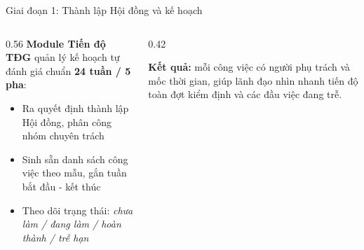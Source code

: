 \documentclass[aspectratio=169, 11pt]{beamer}
\begin{document}
\begin{frame}{Giai đoạn 1: Thành lập Hội đồng và kế hoạch}
\vspace{0.15cm}
\begin{columns}[T]
\begin{column}{0.56\textwidth}\footnotesize
\textbf{\color{daumaroon}Module Tiến độ TĐG} quản lý kế hoạch tự đánh giá chuẩn \textbf{24 tuần / 5 pha}:
\begin{itemize}
  \item Ra quyết định thành lập Hội đồng, phân công nhóm chuyên trách
  \item Sinh sẵn danh sách công việc theo mẫu, gắn tuần bắt đầu - kết thúc
  \item Theo dõi trạng thái: \textit{chưa làm / đang làm / hoàn thành / trễ hạn}
\end{itemize}
\end{column}
\begin{column}{0.42\textwidth}
\begin{tcolorbox}[enhanced, colback=gray100, colframe=daumaroon, boxrule=0pt, leftrule=3pt, arc=2pt, fontupper=\scriptsize]
\textbf{\color{daumaroon}Kết quả:} mỗi công việc có người phụ trách và mốc thời gian, giúp lãnh đạo nhìn nhanh tiến độ toàn đợt kiểm định và các đầu việc đang trễ.
\end{tcolorbox}
\end{column}
\end{columns}
\end{frame}
\end{document}
